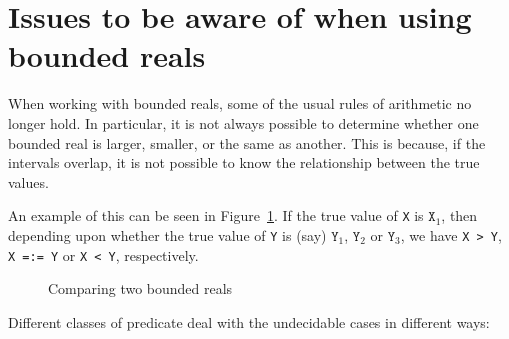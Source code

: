 \section{Issues to be aware of when using bounded reals}

When working with bounded reals, some of the usual rules of arithmetic no
longer hold.  In particular, it is not always possible to determine whether
one bounded real is larger, smaller, or the same as another.  This is
because, if the intervals overlap, it is not possible to know the
relationship between the true values.

{\enableunderscores
An example of this can be seen in Figure~\ref{interval-compare}.  If the
true value of \texttt{X} is $\texttt{X}_1$, then depending upon whether the
true value of \texttt{Y} is (say) $\texttt{Y}_1$, $\texttt{Y}_2$ or
$\texttt{Y}_3$, we have \texttt{X > Y}, \texttt{X =:= Y} or \texttt{X < Y},
respectively.
}

\begin{figure}
\begin{center}
\end{center}
\caption{Comparing two bounded reals}
\label{interval-compare}
\end{figure}

Different classes of predicate deal with the undecidable cases in different
ways:


